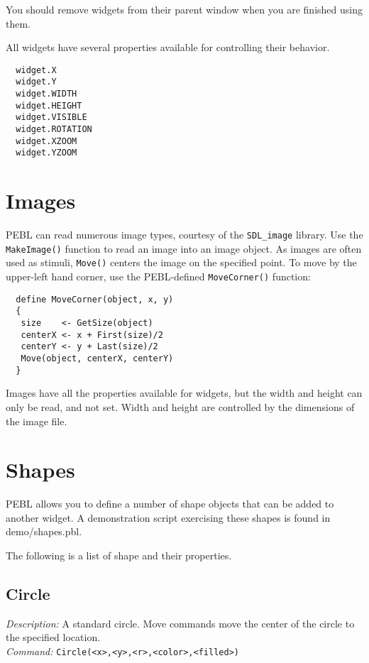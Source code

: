 You should remove widgets from their parent window when you are
finished using them.

All widgets have several properties available for controlling their
behavior.
\begin{verbatim}
  widget.X
  widget.Y
  widget.WIDTH
  widget.HEIGHT
  widget.VISIBLE
  widget.ROTATION
  widget.XZOOM
  widget.YZOOM
\end{verbatim}

  

\section{Images}

PEBL can read numerous image types, courtesy of the
\texttt{SDL\_image} library.  Use the \texttt{MakeImage()} function to
read an image into an image object.  As images are often used as
stimuli, \texttt{Move()} centers the image on the specified point.  To
move by the upper-left hand corner, use the PEBL-defined
\texttt{MoveCorner()} function:
\begin{verbatim}
  define MoveCorner(object, x, y)
  {
   size    <- GetSize(object)
   centerX <- x + First(size)/2
   centerY <- y + Last(size)/2
   Move(object, centerX, centerY)
  }
\end{verbatim}

Images have all the properties available for widgets, but the width
and height can only be read, and not set.  Width and height are
controlled by the dimensions of the image file.

\section{Shapes}
PEBL allows you to define a number of shape objects that can be added
to another widget.  A demonstration script exercising these shapes is found in demo/shapes.pbl.

The following is a list of shape and their properties.

\subsection{Circle}
\emph{Description:} A standard circle.  Move commands move the center
  of the circle to the specified location.\\

\emph{Command:}  \verb+Circle(<x>,<y>,<r>,<color>,<filled>)+\\

